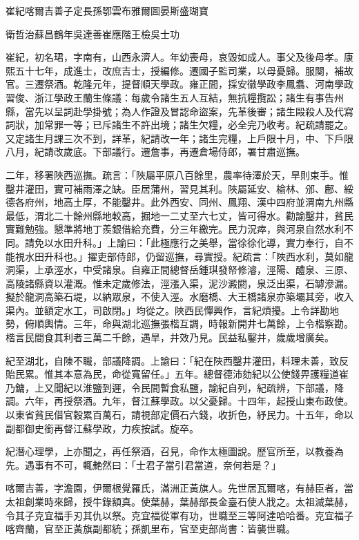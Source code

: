
\begin{pinyinscope}
崔紀喀爾吉善子定長孫鄂雲布雅爾圖晏斯盛瑚寶

衛哲治蘇昌鶴年吳達善崔應階王檢吳士功

崔紀，初名珺，字南有，山西永濟人。年幼喪母，哀毀如成人。事父及後母孝。康熙五十七年，成進士，改庶吉士，授編修。遷國子監司業，以母憂歸。服闋，補故官。三遷祭酒。乾隆元年，提督順天學政。雍正間，採安徽學政李鳳翥、河南學政習俊、浙江學政王蘭生條議：每歲令諸生五人互結，無抗糧攬訟；諸生有事告州縣，當先以呈詞赴學掛號；為人作證及冒認命盜案，先革後審；諸生毆殺人及代寫詞狀，加常罪一等；已斥諸生不許出境；諸生欠糧，必全完乃收考。紀疏請罷之。又定諸生月課三次不到，詳革，紀請改一年；諸生完糧，上戶限十月，中、下戶限八月，紀請改歲底。下部議行。遷詹事，再遷倉場侍郎，署甘肅巡撫。

二年，移署陜西巡撫。疏言：「陜屬平原八百餘里，農率待澤於天，旱則束手。惟鑿井灌田，實可補雨澤之缺。臣居蒲州，習見其利。陜屬延安、榆林、邠、鄜、綏德各府州，地高土厚，不能鑿井。此外西安、同州、鳳翔、漢中四府並渭南九州縣最低，渭北二十餘州縣地較高，掘地一二丈至六七丈，皆可得水。勸諭鑿井，貧民實難勉強。懇準將地丁羨銀借給充費，分三年繳完。民力況瘁，與河泉自然水利不同。請免以水田升科。」上諭曰：「此極應行之美舉，當徐徐化導，實力奉行，自不能視水田升科也。」擢吏部侍郎，仍留巡撫，尋實授。紀疏言：「陜西水利，莫如龍洞渠，上承涇水，中受諸泉。自雍正間總督岳鍾琪發帑修濬，涇陽、醴泉、三原、高陵諸縣資以灌溉。惟未定歲修法，涇漲入渠，泥沙澱閼，泉泛出渠，石罅滲漏。擬於龍洞高築石堤，以納眾泉，不使入涇。水磨橋、大王橋諸泉亦築壩其旁，收入渠內。並額定水工，司啟閉。」均從之。陜西民憚興作，言紀煩擾。上令詳勘地勢，俯順輿情。三年，命與湖北巡撫張楷互調，時報新開井七萬餘，上令楷察勘。楷言民間食其利者三萬二千餘，遇旱，井效乃見。民益私鑿井，歲歲增廣矣。

紀至湖北，自陳不職，部議降調。上諭曰：「紀在陜西鑿井灌田，料理未善，致反貽民累。惟其本意為民，命從寬留任。」五年。總督德沛劾紀以公使錢畀護糧道崔乃鏞，上又聞紀以淮鹽到遲，令民間暫食私鹽，諭紀自列，紀疏辨，下部議，降調。六年，再授祭酒。九年，督江蘇學政。以父憂歸。十四年，起授山東布政使。以東省貧民借官穀累百萬石，請視部定價石六錢，收折色，紓民力。十五年，命以副都御史銜再督江蘇學政，力疾按試。旋卒。

紀潛心理學，上亦聞之，再任祭酒，召見，命作太極圖說。歷官所至，以教養為先。遇事有不可，輒艴然曰：「士君子當引君當道，奈何若是？」

喀爾吉善，字澹園，伊爾根覺羅氏，滿洲正黃旗人。先世居瓦爾喀，有赫臣者，當太祖創業時來歸，授牛錄額真。使葉赫，葉赫部長金臺石使人戕之。太祖滅葉赫，令其子克宜福手刃其仇以祭。克宜福從軍有功，世職至三等阿達哈哈番。克宜福子喀齊蘭，官至正黃旗副都統；孫凱里布，官至吏部尚書：皆襲世職。


\end{pinyinscope}
